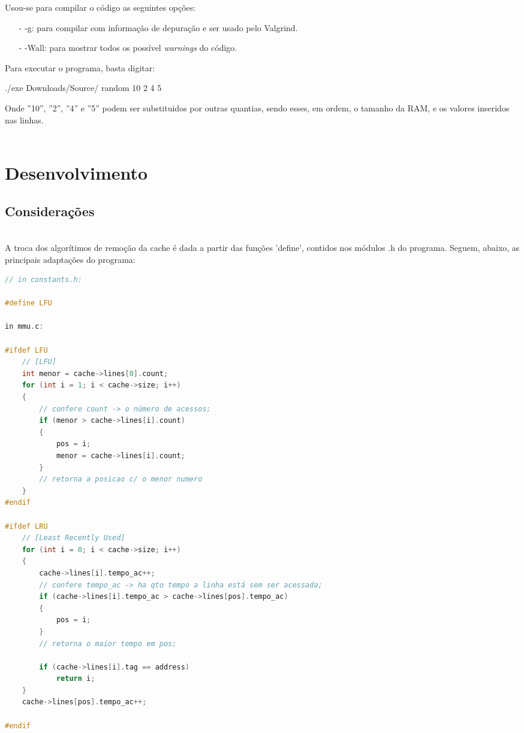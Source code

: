 \documentclass{article}
\begin{document}
Usou-se para compilar o código as seguintes opções:
\begin{itemize}
    \item [-] -g: para compilar com informação de depuração e ser usado pelo Valgrind.
    \item [-] -Wall: para mostrar todos os possível \emph{warnings} do código.
\end{itemize}

Para executar o programa, basta digitar:
\begin{tcolorbox}[title=,width=\linewidth]
    ./exe Downloads/Source/ random 10 2 4 5
\end{tcolorbox}

Onde ''10'', ''2'', ''4'' e ''5'' podem ser substituidos por outras quantias, sendo esses, em ordem, o tamanho da RAM, e os valores inseridos nas linhas.
\\ \\


\clearpage
\section{Desenvolvimento}

\subsection{Considerações}
\noindent\\
A troca dos algorítimos de remoção da cache é dada a partir das funções 'define', contidos nos módulos .h do programa. Seguem, abaixo, as principais adaptações do programa:
\begin{lstlisting}[caption={Exemplo de código LFU e LRU.},label={lst:cod1},language=C]
// in constants.h:

#define LFU

in mmu.c:

#ifdef LFU
    // [LFU]
    int menor = cache->lines[0].count;
    for (int i = 1; i < cache->size; i++)
    {
        // confere count -> o número de acessos;
        if (menor > cache->lines[i].count)
        {
            pos = i;
            menor = cache->lines[i].count;
        }
        // retorna a posicao c/ o menor numero
    }
#endif

#ifdef LRU
    // [Least Recently Used]
    for (int i = 0; i < cache->size; i++)
    {
        cache->lines[i].tempo_ac++;
        // confere tempo_ac -> ha qto tempo a linha está sem ser acessada;
        if (cache->lines[i].tempo_ac > cache->lines[pos].tempo_ac)
        {
            pos = i;
        }
        // retorna o maior tempo em pos;

        if (cache->lines[i].tag == address)
            return i;
    }
    cache->lines[pos].tempo_ac++;

#endif
\end{lstlisting}
\end{document}
